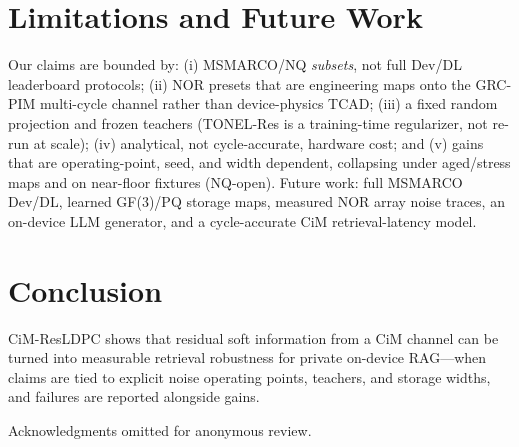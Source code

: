 \documentclass[sigconf,review,anonymous]{acmart}
\begin{document}
\section{Limitations and Future Work}
Our claims are bounded by: (i) MSMARCO/NQ \emph{subsets}, not full Dev/DL leaderboard protocols; (ii) NOR presets that are engineering maps onto the GRC-PIM multi-cycle channel rather than device-physics TCAD; (iii) a fixed random projection and frozen teachers (TONEL-Res is a training-time regularizer, not re-run at scale); (iv) analytical, not cycle-accurate, hardware cost; and (v) gains that are operating-point, seed, and width dependent, collapsing under aged/stress maps and on near-floor fixtures (NQ-open).
Future work: full MSMARCO Dev/DL, learned GF(3)/PQ storage maps, measured NOR array noise traces, an on-device LLM generator, and a cycle-accurate CiM retrieval-latency model.

\section{Conclusion}
CiM-ResLDPC shows that residual soft information from a CiM channel can be turned into measurable retrieval robustness for private on-device RAG---when claims are tied to explicit noise operating points, teachers, and storage widths, and failures are reported alongside gains.

\begin{acks}
Acknowledgments omitted for anonymous review.
\end{acks}



\end{document}
